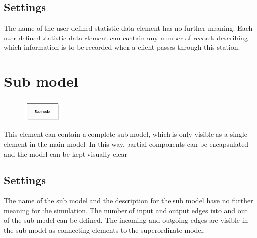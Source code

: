 \subsection*{Settings}

The name of the user-defined statistic data element has no further meaning.
Each user-defined statistic data element can contain any number of records
describing which information is to be recorded when a client passes through
this station.


\section{Sub model}
\label{ref:ModelElementSub}

\begin{figure}
\vspace{-22pt}
\includegraphics[width=2cm]{imageModelElementSub.png}
\vspace{-22pt}
\end{figure}

This element can contain a complete sub model, which is only visible as a single element in the main model.
In this way, partial components can be encapsulated and the model can be kept visually clear.

\subsection*{Settings}

The name of the sub model and the description for the sub model have
no further meaning for the simulation.
The number of input and output edges into and out of the sub model can
be defined. The incoming and outgoing edges are visible in the sub model
as connecting elements to the superordinate model.





